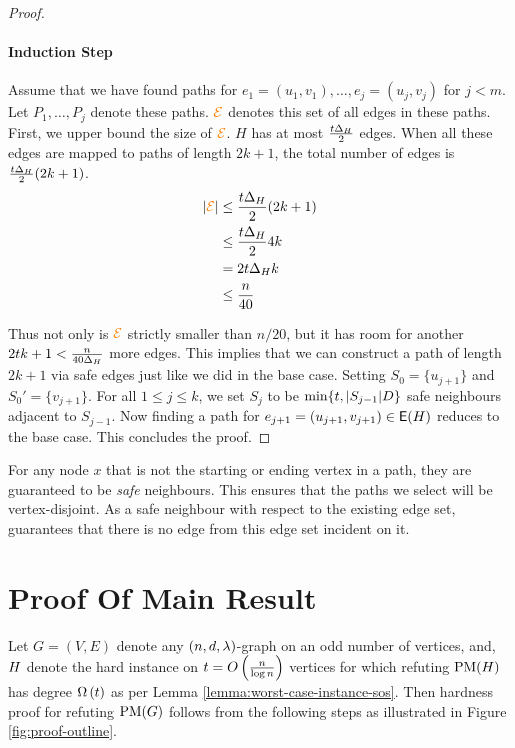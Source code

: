\documentclass[11pt]{article}
\begin{document}
\begin{proof}
\paragraph{Induction Step}

Assume that we have found paths for $e_1 = (u_1, v_1), \dots, e_j=(u_j, v_j)$ for $j < m$.
Let $P_1, \dots, P_j$ denote these paths.
$\textcolor{orange}{\mathcal{E}}$ denotes this set of all edges in these paths.
First, we upper bound the size of $\textcolor{orange}{\mathcal{E}}$.
$H$ has at most $\frac{t\Delta_{H}}{2}$ edges.
When all these edges are mapped to paths of length $2k+1$, the total number of edges is $\frac{t\Delta_{H}}{2}(2k+1)$.
\begin{align*}
  |\textcolor{orange}{\mathcal{E}}|  &\leq \frac{t\Delta_{H}}{2}(2k+1) \\
                         &\le \frac{t\Delta_{H}}{2}4k \\
                         &= 2t\Delta_{H}k \\
                         &\leq \frac{n}{40}
\end{align*}

Thus not only is $\textcolor{orange}{\mathcal{E}}$ strictly smaller than $n/20$, but it has room for another $2tk+1 < \frac{n}{40\Delta_{H}}$ more edges.
This implies that we can construct a path of length $2k+1$ via safe edges just like we did in the base case.
Setting $S_0 = \{ u_{j+1}\}$ and $S_0' = \{v_{j+1} \}$.
For all $1 \le j \le k$, we set $S_{j}$ to be $\min\{t, |S_{j-1}|D \}$ safe neighbours adjacent to $S_{j-1}$.
Now finding a path for $e_{j+1} = (u_{j+1},v_{j+1}) \in \mathsf{E}(H)$ reduces to the base case.
This concludes the proof.

\end{proof}

\begin{remark}For any node $x$ that is not the starting or ending vertex in a path, they are guaranteed to be \emph{safe} neighbours.
  This ensures that the paths we select will be vertex-disjoint.
  As a safe neighbour with respect to the existing edge set, guarantees that there is no edge from this edge set incident on it.
\end{remark}


\section{Proof Of Main Result}
\label{sec:main-proof}

Let $G=(V,E)$ denote any $(n, d, \lambda)$-graph on an odd number of vertices, and,  $H$ denote the hard instance on $t=O\left(\frac{n}{\log n}\right)$ vertices for which refuting $\text{PM}(H)$ has degree $\Omega\left(t\right)$ as per Lemma \ref{lemma:worst-case-instance-sos}.
Then hardness proof for refuting $\text{PM}(G)$ follows from the following steps as illustrated in Figure \ref{fig:proof-outline}.
\end{document}
